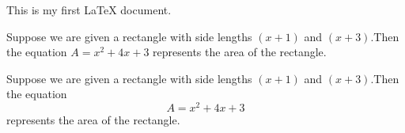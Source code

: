 \documentclass[11pt]{article}
\begin{document}
This is my first LaTeX document.

Suppose we are given a rectangle with side lengths $(x+1)$ and $(x+3)$.Then the equation $A=x^2+4x+3$ represents the area of the rectangle.

Suppose we are given a rectangle with side lengths $(x+1)$ and $(x+3)$.Then the equation $$A=x^2+4x+3$$ represents the area of the rectangle.
\end{document}
